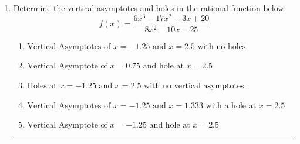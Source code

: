 \documentclass[14pt]{extbook}
\newcommand{\litem}[1]{\item#1\hspace*{-1cm}\rule{\textwidth}{0.4pt}}
\begin{document}
\begin{enumerate}
{\begin{enumerate}[label=\Alph*.]
\end{enumerate} }
\litem{
Determine the vertical asymptotes and holes in the rational function below.\[ f(x) = \frac{6x^{3} -17 x^{2} -3 x + 20}{8x^{2} -10 x -25} \]\begin{enumerate}[label=\Alph*.]
\item \( \text{Vertical Asymptotes of } x = -1.25 \text{ and } x = 2.5 \text{ with no holes.} \)
\item \( \text{Vertical Asymptote of } x = 0.75 \text{ and hole at } x = 2.5 \)
\item \( \text{Holes at } x = -1.25 \text{ and } x = 2.5 \text{ with no vertical asymptotes.} \)
\item \( \text{Vertical Asymptotes of } x = -1.25 \text{ and } x = 1.333 \text{ with a hole at } x = 2.5 \)
\item \( \text{Vertical Asymptote of } x = -1.25 \text{ and hole at } x = 2.5 \)

\end{enumerate} }
\end{enumerate}
\end{document}
